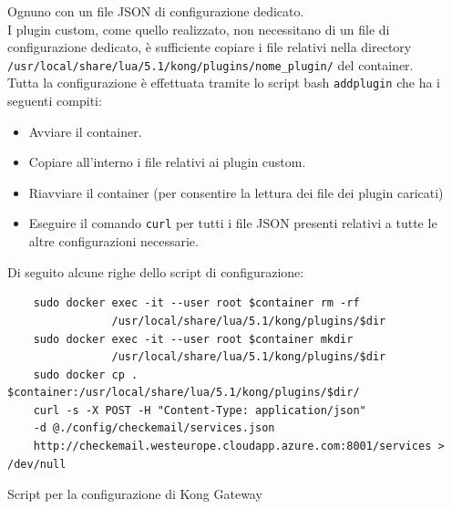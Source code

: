 Ognuno con un file JSON di configurazione dedicato.\\
I plugin custom, come quello realizzato, non necessitano di un file di configurazione dedicato, è sufficiente copiare i file relativi nella directory\\
\texttt{/usr/local/share/lua/5.1/kong/plugins/nome\_plugin/} del container.\\

Tutta la configurazione è effettuata tramite lo script bash \texttt{addplugin} che ha i seguenti compiti:
\begin{itemize}
\item Avviare il container.
\item Copiare all'interno i file relativi ai plugin custom.
\item Riavviare il container (per consentire la lettura dei file dei plugin caricati)
\item Eseguire il comando \texttt{curl} per tutti i file JSON presenti relativi a tutte le altre configurazioni necessarie.
\end{itemize}
Di seguito alcune righe dello script di configurazione:

\begin{algorithm}
\centering
\begin{verbatim}
    sudo docker exec -it --user root $container rm -rf 
				/usr/local/share/lua/5.1/kong/plugins/$dir
    sudo docker exec -it --user root $container mkdir
				/usr/local/share/lua/5.1/kong/plugins/$dir
    sudo docker cp . $container:/usr/local/share/lua/5.1/kong/plugins/$dir/
    curl -s -X POST -H "Content-Type: application/json"
	-d @./config/checkemail/services.json
	http://checkemail.westeurope.cloudapp.azure.com:8001/services > /dev/null
\end{verbatim}
\caption{Script per la configurazione di Kong Gateway}\label{alg:container_config}
\end{algorithm}

